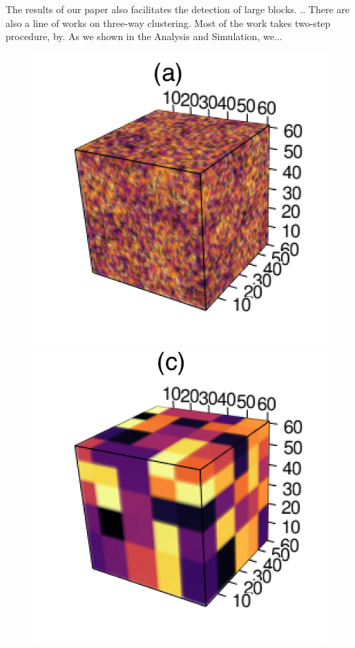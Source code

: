 \documentclass{article}
\begin{document}
The results of our paper also facilitates the detection of large blocks. .. There are also a line of works on three-way clustering. Most of the work takes two-step procedure, by. As we shown in the Analysis and Simulation, we... 

\begin{figure}[!h]
	\centering
	\includegraphics[scale=0.35]{figures/figure1/input.png}
	\includegraphics[scale=0.35]{figures/figure1/output.png}

\end{figure}
\end{document}
